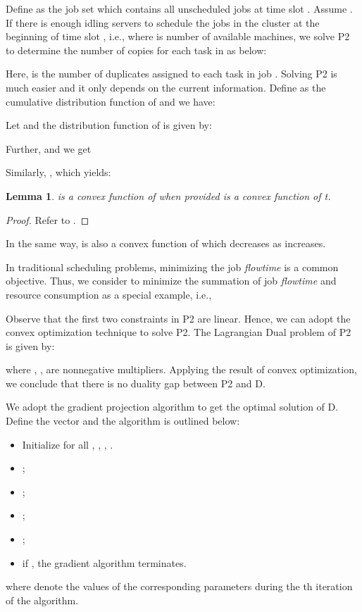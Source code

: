 \documentclass[10pt,conference]{IEEEtran}
\newtheorem{lemma}{Lemma}
\begin{document}
Define  as the job set which contains all unscheduled jobs at time slot . Assume . If there is enough idling servers to schedule the jobs in the cluster at the beginning of time slot , i.e.,  where  is number of available machines, we solve P2 to determine the number of copies for each task in  as below:


Here,  is the number of duplicates assigned to each task in job . Solving P2 is much easier and it only depends on the current information. Define  as the cumulative distribution function of  and we have:

Let  and the distribution function of  is given by:

Further,  and we get

Similarly,
, which yields:


\begin{lemma}
 is a convex function of  when provided  is a convex function of t.
\end{lemma}

\begin{proof}
Refer to \cite{speculative-multi-job}.
\end{proof}
\vspace{.5em}
In the same way,  is also a convex function of  which decreases as  increases.

In traditional scheduling problems, minimizing the job \textit{flowtime} is a common objective. Thus, we consider to minimize the summation of job \textit{flowtime} and resource consumption as a special example, i.e., 

Observe that the first two constraints in P2 are linear. Hence, we can adopt the convex optimization technique to solve P2. The Lagrangian Dual problem of P2 is given by:



where , ,  are nonnegative multipliers. Applying the result of convex optimization, we conclude that there is no duality gap between P2 and D.

We adopt the gradient projection algorithm to get the optimal solution of D.
Define the vector  and the algorithm is outlined below:
\begin{itemize}
\item Initialize  for all , , , .
\item ;
\item ;
\item ;
\item ;
\item if , the gradient algorithm terminates.
\end{itemize}
where  denote the values of the corresponding parameters
during the th iteration of the algorithm.
\end{document}

